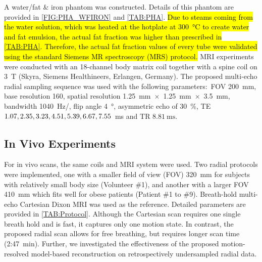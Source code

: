 \documentclass[journal,twoside,web]{ieeecolor}
\newcommand{\splitatcommas}[1]{%
	\begingroup
	\begingroup\lccode`~=`, \lowercase{\endgroup
		\edef~{\mathchar\the\mathcode`, \penalty0 \noexpand\hspace{0pt plus 1em}}%
	}\mathcode`,="8000 #1%
	\endgroup
}
\begin{document}
A water/fat \& iron phantom \cite{hines_2009_wfiron,bush_2018_fat} was constructed. 
Details of this phantom are provided in \cref{FIG:PHA_WFIRON} and \cref{TAB:PHA}. 
\hl{Due to steams coming from the water solution, 
which was heated at the hotplate at \mbox{\SI{300}{\celsius}} 
to create water and fat emulsion, 
the actual fat fraction was higher than prescribed in \mbox{\cref{TAB:PHA}}. 
Therefore, the actual fat fraction values of every tube were validated using 
the standard Siemens MR spectroscopy (MRS) protocol.} 
MRI experiments were conducted with an 18-channel body matrix coil 
together with a spine coil on 
\SI{3}{\tesla} (Skyra, Siemens Healthineers, Erlangen, Germany). 
The proposed multi-echo radial sampling sequence was used 
with the following parameters:~FOV \SI{200}{\milli\metre}, 
base resolution 160, spatial resolution 
\SI{1.25}{\milli\meter}~$\times$~\SI{1.25}{\milli\meter}~$\times$~\SI{3.5}{\milli\meter},
bandwidth \SI{1040}{\hertz/\pixel}, flip angle \SI{4}{\degree}, 
asymmetric echo \cite{untenberger_2016_asym} of \SI{30}{\percent}, 
TE $\splitatcommas{1.07, 2.35, 3.23, 4.51, 5.39, 6.67, 7.55}$~\si{\ms} 
and TR $\SI{8.81}{\ms}$. 


\subsection{In Vivo Experiments}

For in vivo scans, the same coils and MRI system were used. 
Two radial protocols were implemented, one with a smaller field of view (FOV) 
\SI{320}{\milli\meter} for subjects with relatively small body size (Volunteer \#1), 
and another with a larger FOV \SI{410}{\milli\meter} 
which fits well for obese patients (Patient \#1 to \#9).
Breath-hold multi-echo Cartesian Dixon MRI was used as the reference. 
Detailed parameters are provided in \cref{TAB:Protocol}. 
Although the Cartesian scan requires one single breath hold 
and is fast, it captures only one motion state. 
In contrast, the proposed radial scan allows for free breathing, 
but requires longer scan time (2:47~\si{\minute}). 
Further, we investigated the effectiveness of 
the proposed motion-resolved model-based reconstruction 
on retrospectively undersampled radial data.
\end{document}
